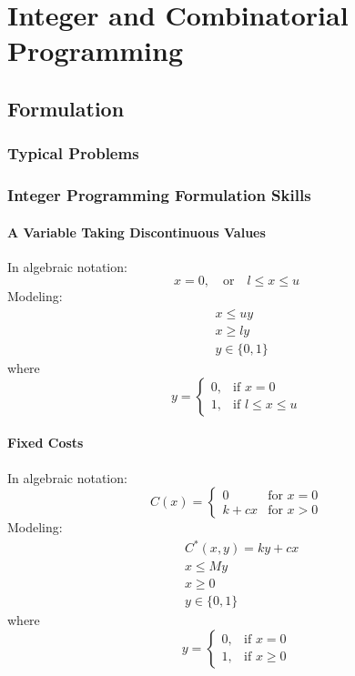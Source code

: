 \part{Integer and Combinatorial Programming}
	\chapter{Formulation}
		\section{Typical Problems}

		\section{Integer Programming Formulation Skills}
			\subsection{A Variable Taking Discontinuous Values}
				In algebraic notation: 
				\begin{equation}
					x = 0,\quad \text{or} \quad l\le x \le u 
				\end{equation}
				Modeling:
				\begin{align}
					& x \le uy \\
					& x \ge ly  \\
					& y \in \{0, 1\} 
				\end{align}
				where
				\begin{equation}y=\begin{cases}0, & \text{if }x=0 \\ 1, & \text{if } l\le x \le u\end{cases} \end{equation}
					
			\subsection{Fixed Costs}
				In algebraic notation: 
				\begin{equation}
					C(x) = \begin{cases} 0 & \text{for } x=0 \\ k + cx & \text{for } x > 0 \end{cases} 
				\end{equation}
				Modeling:
				\begin{align}
					& C^*(x, y) = ky+cx\\
					& x \le My  \\
					& x \ge 0 \\
					& y \in \{0, 1\} 
				\end{align}
				where
				\begin{equation}y=\begin{cases}0, & \text{if }x=0 \\ 1, & \text{if }x\ge 0\end{cases} \end{equation}
			

